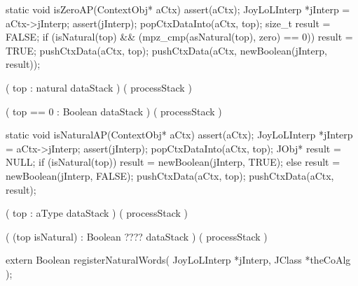\stopWord

\stoptyping

\startCCode
static void isZeroAP(ContextObj* aCtx) {
  assert(aCtx);
  JoyLoLInterp *jInterp = aCtx->jInterp;
  assert(jInterp);
  popCtxDataInto(aCtx, top);
  size_t result = FALSE;
  if (isNatural(top) &&
      (mpz_cmp(asNatural(top), zero) == 0)) result = TRUE;
  pushCtxData(aCtx, top);
  pushCtxData(aCtx, newBoolean(jInterp, result));
}
\stopCCode

\starttyping

\startWord[isZero]

\preDataStack
  (
    top : natural
    dataStack
  )
\preProcessStack
  ( processStack )
\preConditions
\stopPreConditions

\postDataStack
  (
    top == 0 : Boolean
    dataStack
  )
\postProcessStack
  ( processStack )
\postConditions
\stopPostConditions

\stopWord

\stoptyping

\startCCode
static void isNaturalAP(ContextObj* aCtx) {
  assert(aCtx);
  JoyLoLInterp *jInterp = aCtx->jInterp;
  assert(jInterp);
  popCtxDataInto(aCtx, top);
  JObj* result = NULL;
  if (isNatural(top))
    result = newBoolean(jInterp, TRUE);
  else
    result = newBoolean(jInterp, FALSE);
  pushCtxData(aCtx, top);
  pushCtxData(aCtx, result);
}
\stopCCode

\starttyping

\startWord[isNatural]

\preDataStack
  (
    top : aType
    dataStack
  )
\preProcessStack
  ( processStack )
\preConditions
\stopPreConditions

\postDataStack
  ( 
    (top isNatural) : Boolean ????
    dataStack
  )
\postProcessStack
  ( processStack )
\postConditions
\stopPostConditions

\stopWord

\stoptyping

\startCHeader
extern Boolean registerNaturalWords(
  JoyLoLInterp *jInterp,
  JClass       *theCoAlg
);
\stopCHeader
{}

